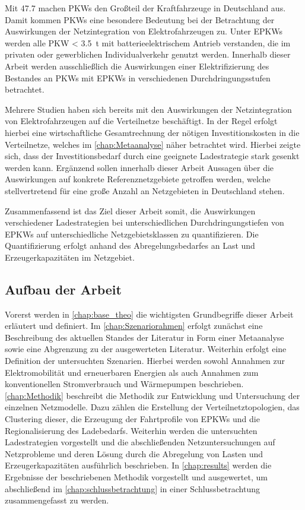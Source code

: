Mit \SI{47.7}{\MioStk} \cite{KBA2020a} machen \glspl{PKW} den Großteil der Kraftfahrzeuge in Deutschland aus.
Damit kommen \glspl{PKW} eine besondere Bedeutung bei der Betrachtung der Auswirkungen der Netzintegration von Elektrofahrzeugen zu.
Unter \glspl{EPKW} werden alle \gls{PKW} \SI{< 3.5}{\tonne} mit batterieelektrischem Antrieb verstanden, die im privaten oder gewerblichen Individualverkehr genutzt werden. \cite{BNetzA2020}
Innerhalb dieser Arbeit werden ausschließlich die Auswirkungen einer Elektrifizierung des Bestandes an \glspl{PKW} mit \glspl{EPKW} in verschiedenen Durchdringungsstufen betrachtet.\medskip

Mehrere Studien haben sich bereits mit den Auswirkungen der Netzintegration von Elektrofahrzeugen auf die Verteilnetze beschäftigt. \cite{Agora2019} \cite{DEAGH2018} \cite{BCG2018}
In der Regel erfolgt hierbei eine wirtschaftliche Gesamtrechnung der nötigen Investitionskosten in die Verteilnetze, welches im \autoref{chap:Metaanalyse} näher betrachtet wird.
Hierbei zeigte sich, dass der Investitionsbedarf durch eine geeignete Ladestrategie stark gesenkt werden kann.
Ergänzend sollen innerhalb dieser Arbeit Aussagen über die Auswirkungen auf konkrete Referenznetzgebiete getroffen werden, welche stellvertretend für eine große Anzahl an Netzgebieten in Deutschland stehen.\medskip

Zusammenfassend ist das Ziel dieser Arbeit somit, die Auswirkungen verschiedener Lade\-strategien bei unterschiedlichen Durchdringungstiefen von \glspl{EPKW} auf unterschiedliche Netzgebietsklassen zu quantifizieren.
Die Quantifizierung erfolgt anhand des Abregelungsbedarfes an Last und Erzeugerkapazitäten im Netzgebiet.


\subsection{Aufbau der Arbeit}

Vorerst werden in \autoref{chap:base_theo} die wichtigsten Grundbegriffe dieser Arbeit erläutert und definiert.
Im \autoref{chap:Szenariorahmen} erfolgt zunächst eine Beschreibung des aktuellen Standes der Literatur in Form einer Metaanalyse sowie eine Abgrenzung zu der ausgewerteten Literatur.
Weiterhin erfolgt eine Definition der untersuchten Szenarien.
Hierbei werden sowohl Annahmen zur Elektromobilität und erneuerbaren Energien als auch Annahmen zum konventionellen Stromverbrauch und Wärmepumpen beschrieben.
\autoref{chap:Methodik} beschreibt die Methodik zur Entwicklung und Untersuchung der einzelnen Netzmodelle.
Dazu zählen die Erstellung der Verteilnetztopologien, das Clustering dieser, die Erzeugung der Fahrtprofile von \glspl{EPKW} und die Regionalisierung des Ladebedarfs.
Weiterhin werden die untersuchten Ladestrategien vorgestellt und die abschließenden Netzuntersuchungen auf Netzprobleme und deren Lösung durch die Abregelung von Lasten und Erzeugerkapazitäten ausführlich beschrieben.
In \autoref{chap:results} werden die Ergebnisse der beschriebenen Methodik vorgestellt und ausgewertet, um abschließend im \autoref{chap:schlussbetrachtung} in einer Schlussbetrachtung zusammengefasst zu werden.

